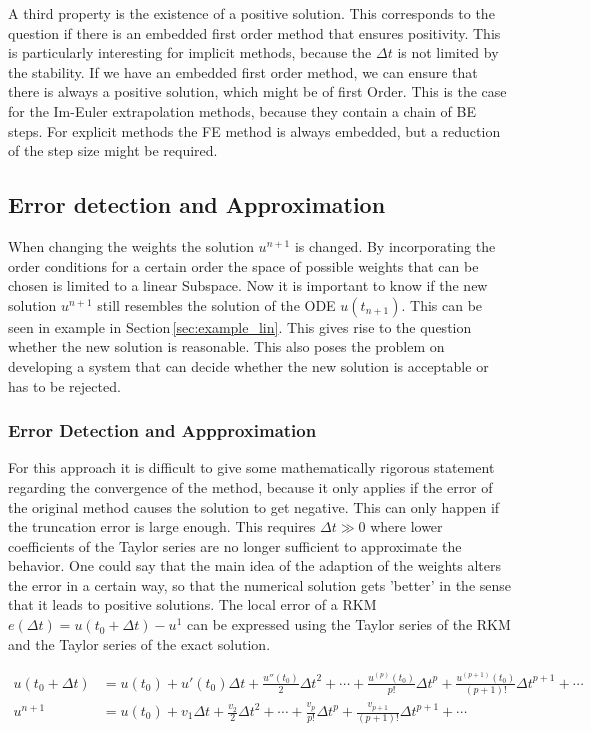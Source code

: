 \documentclass[a4paper]{article}
\numberwithin{equation}{section}
\theoremstyle{plain}
\theoremstyle{definition}
\numberwithin{theorem}{section}
\newcommand{\dt}{{\Delta t}}
\newcommand{\1}{\mathbbm{1}}
\begin{document}
A third property is the existence of a positive solution. This corresponds to the question if there is an embedded first order method that ensures positivity. This is particularly interesting for implicit methods, because the $\dt$ is not limited by the stability.  
If we have an embedded first order method, we can ensure that there is always a positive solution, which might be of first Order.  
This is the case for the Im-Euler extrapolation methods, because they contain a chain of BE steps. 
For explicit methods the FE method is always embedded, but a reduction of the step size might be required. 

\subsection{Error detection and Approximation}
When changing the weights the solution $u^{n+1}$ is changed. 
By incorporating the order conditions for a certain order the space of possible weights that can be chosen is limited to a linear Subspace. 
Now it is important to know if the new solution $u^{n+1}$ still resembles the solution of the ODE $u(t_{n+1})$. 
This can be seen in example in Section\,\ref{sec:example_lin}. 
This gives rise to the question whether the new solution is reasonable.
This also poses the problem on developing a system that can decide whether the new solution is acceptable or has to be rejected.
 
\subsubsection{Error Detection and Appproximation}
For this approach it is difficult to give some mathematically rigorous statement regarding the convergence of the method, because it only applies if the error of the original method causes the solution to get negative. This can only happen if the truncation error is large enough. This requires $\dt \gg 0$ where lower coefficients of the Taylor series are no longer sufficient to approximate the behavior. 
One could say that the main idea of the adaption of the weights alters the error in a certain way, so that the numerical solution gets 'better' in the sense that it leads to positive solutions. 
The local error of a RKM $e(\dt) =u(t_0 + \dt) - u^1$ can be expressed using the Taylor series of the RKM and the Taylor series of the exact solution. %

\begin{align}\label{eq:Taylor_sol_ref}
u(t_0 + \dt) &= u(t_0) + u'(t_0) \dt + \frac{u''(t_0)}{2} \dt^2 + \cdots + \frac{u^{(p)}(t_0)}{p!} \dt^p + \frac{u^{(p+1)}(t_0)}{(p+1)!} \dt^{p+1} + \cdots \\
u^{n+1} &= u(t_0)  + v_1 \dt + \frac{v_2}{2} \dt^2 + \cdots + \frac{v_p}{p!} \dt^p + \frac{v_{p+1}}{(p+1)!} \dt^{p+1} + \cdots 
\end{align}
\end{document}
